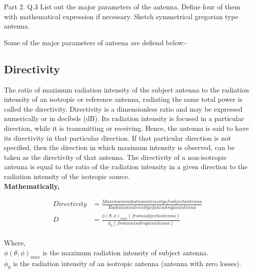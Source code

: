 \documentclass[a4paper,12pt]{article}
\begin{document}


\begin{Q}
    {
        Part 2. Q.3 List out the major parameters of the antenna. Define four of them with mathematical expression if necessary.
        Sketch symmetrical gregorian type antenna.
    }
\end{Q}

\begin{A}
    {
        Some of the major parameters of anteena are defiend below:-


        \subsection{Directivity}
        The ratio of maximum radiation intensity of the subject antenna to the radiation intensity of an isotropic or reference antenna,
        radiating the same total power is called the directivity.
        Directivity is a dimensionless ratio and may be expressed numerically or in decibels (dB).
        Its radiation intensity is focused in a particular direction, while it is transmitting or receiving.
        Hence, the antenna is said to have its directivity in that particular direction.
        If that particular direction is not specified, then the direction in which maximum intensity is observed,
        can be taken as the directivity of that antenna.
        The directivity of a non-isotropic antenna is equal to the ratio of the radiation intensity in a given direction to the radiation intensity of the isotropic source.\\

        \textbf{Mathematically,}

        \begin{align*}
            Directivity & =  \frac{Maximum radiation intensity of subject antenna}{Radiation intensity of an isotropic antenna} \\
            D           & =  \frac{\phi(\theta,\phi)_{max}(from  subject antenna)} {\phi_{0}(from  an isotropic antenna) }      \\
        \end{align*}

        Where,\\

        \({\phi(\theta,\phi)_{max}}\) is the  maximum radiation intensity of subject antenna.\\

        \({\phi_{0}}\)  is the radiation intensity of an isotropic antenna (antenna with zero losses).




}
\end{A}
\end{document}
